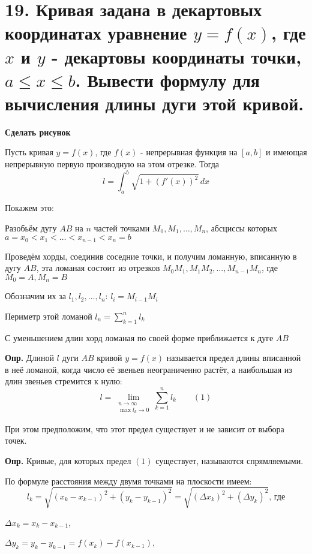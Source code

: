 \documentclass[11pt]{article}
\begin{document}
\section*{19. Кривая задана в декартовых координатах уравнение $y = f(x)$, где $x$ и $y$ - декартовы координаты точки, $a \leq x \leq b$. Вывести формулу для вычисления длины дуги этой кривой.}
\par\textbf{Сделать рисунок}
\par Пусть кривая $y = f(x)$, где $f(x)$ - непрерывная функция на $[a, b]$ и имеющая непрерывную первую производную на этом отрезке. Тогда $$l = \int_{a}^{b} \sqrt{ 1 + (f'(x))^2 } \, dx$$
\par Покажем это:
\par Разобьём дугу $AB$ на $n$ частей точками $M_{0}, M_{1}, \dots, M_{n}$, абсциссы которых $a = x_{0} < x_{1} < \dots < x_{n-1} < x_{n} = b$
\par Проведём хорды, соединив соседние точки, и получим ломанную, вписанную в дугу $AB$, эта ломаная состоит из отрезков $M_{0}M_{1}, M_{1}M_{2}, \dots, M_{n-1}M_{n}$, где $M_{0} = A, M_{n} = B$
\par Обозначим их за $l_{1}, l_{2}, \dots, l_{n}$: $l_{i} = M_{i-1}M_{i}$
\par Периметр этой ломаной $l_{n} = \sum_{k=1}^{n} l_{k}$
\par С уменьшением длин хорд ломаная по своей форме приближается к дуге $AB$
\begin{displayquote}
\par\textbf{Опр.} Длиной $l$ дуги $AB$ кривой $y = f(x)$ называется предел длины вписанной в неё ломаной, когда число её звеньев неограниченно растёт, а наибольшая из длин звеньев стремится к нулю: $$l = \lim_{\substack{n \to \infty \\ \max l_{k} \to 0}} \sum_{k=1}^n l_{k} \qquad(1)$$
\par При этом предположим, что этот предел существует и не зависит от выбора точек.
\par\textbf{Опр.} Кривые, для которых предел $(1)$ существует, называются спрямляемыми.
\end{displayquote}
\par По формуле расстояния между двумя точками на плоскости имеем:$$l_{k} = \sqrt{ (x_{k} - x_{k-1})^2 + (y_{k} - y_{k-1})^2 } = \sqrt{ (\Delta x_{k})^2 + (\Delta y_{k})^2} \text{, где}$$
\par $\Delta x_{k} = x_{k} - x_{k-1}$,
\par $\Delta y_{k} = y_{k} - y_{k-1} = f(x_{k}) - f(x_{k-1})$,
\end{document}
